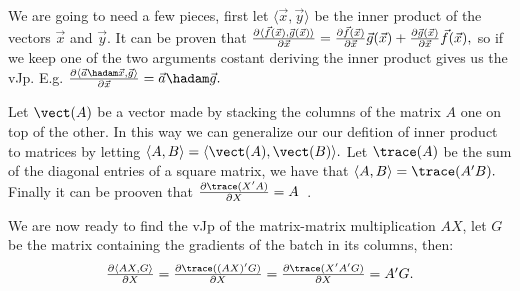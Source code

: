 \documentclass{article}
\begin{document}
We are going to need a few pieces, first let \(\langle\vec x,\vec y\rangle\) be
the inner product of the vectors \(\vec x\) and \(\vec y.\) It can be proven
that \(\textstyle\frac{\partial\langle\vec f(\vec x),\vec g(\vec x)\rangle}{\partial\vec x}
= \textstyle\frac{\partial\vec f(\vec x)}{\partial\vec x} \vec g(\vec x)
	+ \textstyle\frac{\partial\vec g(\vec x)}{\partial\vec x} \vec f(\vec x),\) so if we keep one
of the two arguments costant deriving the inner product gives us the vJp. E.g.
\(\partialfrac{\langle\vec a \hadam \vec x,\vec g\rangle}{\vec x}
= \vec a \hadam \vec g.\)

Let \(\vect(A)\) be a vector made by stacking the columns of the matrix \(A\)
one on top of the other. In this way we can generalize our our defition of
inner product to matrices by letting \(\langle A,B\rangle =
\langle\vect(A),\vect(B)\rangle.\) Let \(\trace(A)\) be the sum of the diagonal
entries of a square matrix, we have that \(\langle A,B\rangle = \trace(A'B).\)
Finally it can be prooven that \(\partialfrac{\trace(X'A)}{X} =
A\)~\cite{cookbook,magnus}.

We are now ready to find the vJp of the matrix-matrix multiplication \(A X\),
let \(G\) be the matrix containing the gradients of the batch in its columns,
then: \[
\partialfrac{\langle AX,G\rangle}{X}
= \partialfrac{\trace((AX)'G)}{X}
= \partialfrac{\trace(X'A'G)}{X}
= A'G.\]



\end{document}

